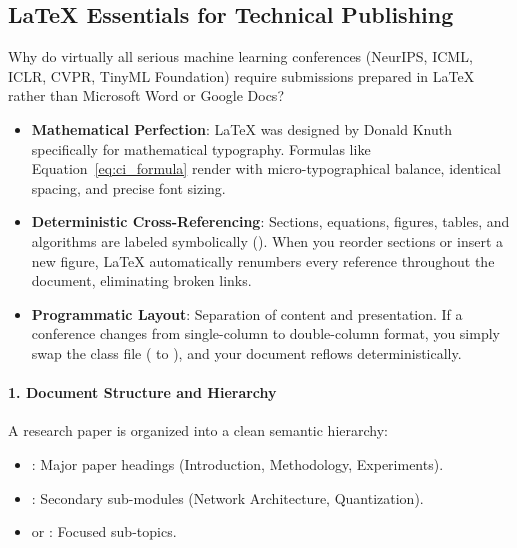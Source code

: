 \subsection{\LaTeX{} Essentials for Technical Publishing}\label{subsec:latex_publishing}

Why do virtually all serious machine learning conferences (NeurIPS, ICML, ICLR, CVPR, TinyML Foundation) require submissions prepared in \LaTeX{} rather than Microsoft Word or Google Docs?
\begin{itemize}
    \item \textbf{Mathematical Perfection}: \LaTeX{} was designed by Donald Knuth specifically for mathematical typography. Formulas like Equation~\eqref{eq:ci_formula} render with micro-typographical balance, identical spacing, and precise font sizing.
    \item \textbf{Deterministic Cross-Referencing}: Sections, equations, figures, tables, and algorithms are labeled symbolically (). When you reorder sections or insert a new figure, \LaTeX{} automatically renumbers every reference throughout the document, eliminating broken links.
    \item \textbf{Programmatic Layout}: Separation of content and presentation. If a conference changes from single-column to double-column format, you simply swap the class file ( to ), and your document reflows deterministically.
\end{itemize}

\paragraph{1. Document Structure and Hierarchy}
A research paper is organized into a clean semantic hierarchy:
\begin{itemize}
    \item {}: Major paper headings (Introduction, Methodology, Experiments).
    \item {}: Secondary sub-modules (Network Architecture, Quantization).
    \item {} or : Focused sub-topics.
\end{itemize}


